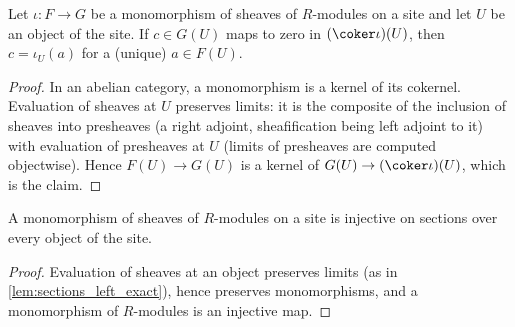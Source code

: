 \begin{lemma}
  \label{lem:sections_left_exact}
  \leanok
  Let \(\iota : F \to G\) be a monomorphism of sheaves of \(R\)-modules on a site and let
  \(U\) be an object of the site. If \(c \in G(U)\) maps to zero in \((\coker \iota)(U)\),
  then \(c = \iota_U(a)\) for a (unique) \(a \in F(U)\).
\end{lemma}
\begin{proof}
  \leanok
  In an abelian category, a monomorphism is a kernel of its cokernel. Evaluation of sheaves
  at \(U\) preserves limits: it is the composite of the inclusion of sheaves into presheaves
  (a right adjoint, sheafification being left adjoint to it) with evaluation of presheaves at
  \(U\) (limits of presheaves are computed objectwise). Hence
  \(F(U) \to G(U)\) is a kernel of \(G(U) \to (\coker \iota)(U)\), which is the claim.
\end{proof}

\begin{lemma}
  \label{lem:app_injective_of_mono}
  \leanok
  A monomorphism of sheaves of \(R\)-modules on a site is injective on sections over every
  object of the site.
\end{lemma}
\begin{proof}
  \leanok
  Evaluation of sheaves at an object preserves limits (as in
  \ref{lem:sections_left_exact}), hence preserves monomorphisms, and a monomorphism of
  \(R\)-modules is an injective map.
\end{proof}

